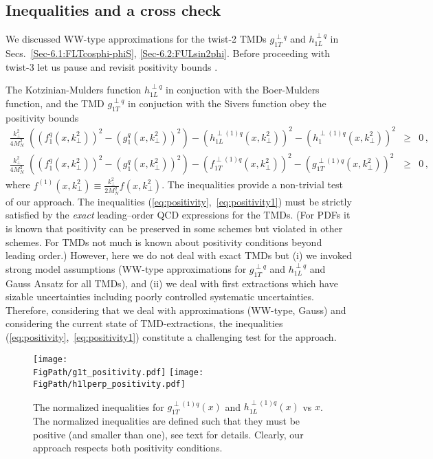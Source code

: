 \documentclass[a4paper,11pt]{article}
\newcommand{\blue}[1]{{\color{blue} #1}}
\newcommand{\ba}{\begin{eqnarray}}
\newcommand{\ea}{\end{eqnarray}}
\newcommand{\ps}[1]{\blue{ #1}}
\def\kperp{k_\perp}
\newcommand*{\FigPath}{./figs}%
\begin{document}
\ps{

\subsection{Inequalities and a cross check}

We discussed WW-type approximations for the twist-2 TMDs
$g^{\perp q}_{1T}$ and $h^{\perp q}_{1L}$ 
in Secs.~\ref{Sec-6.1:FLTcosphi-phiS}, \ref{Sec-6.2:FULsin2phi}.
Before proceeding with twist-3 let us pause and revisit positivity 
bounds \cite{Bacchetta:1999kz}. %

The Kotzinian-Mulders function $h^{\perp q}_{1L}$ in conjuction with 
the Boer-Mulders function, and the TMD $g^{\perp q}_{1T}$ in conjuction 
with the Sivers function obey the positivity bounds 
\cite{Bacchetta:1999kz}
\begin{subequations}\ba
	\frac{\kperp^2}{4M_N^2}\;\left((f_{1}^{q}(x,\kperp^2))^2 -(g_{1}^{q}(x,\kperp^2))^2\right)
	- (h^{\perp(1)q}_{1L}(x,\kperp^2))^2 
	- (h_{1}^{\perp(1)q}(x,\kperp^2))^2
	& \ge & 0\,, \label{eq:positivity}\\
	\frac{\kperp^2}{4M_N^2}\;\left((f_{1}^{q}(x,\kperp^2))^2 -(g_{1}^{q}(x,\kperp^2))^2\right)
	- (f_{1T}^{\perp(1)q}(x,\kperp^2))^2
	- (g^{\perp(1)q}_{1T}(x,\kperp^2))^2 
	& \ge & 0\,, \label{eq:positivity1}
\ea\end{subequations}
where $f^{(1)}(x,\kperp^2) \equiv \frac{\kperp^2}{2M_N^2} f(x,\kperp^2)$.
The inequalities provide a non-trivial test of our approach.
The inequalities (\ref{eq:positivity},~\ref{eq:positivity1}) 
must be strictly satisfied by the {\it exact} leading--order QCD 
expressions for the TMDs.  
(For PDFs it is known that positivity can be preserved in some 
schemes but violated in other schemes. For TMDs not much is 
known about positivity conditions beyond leading order.)
However, here we do not deal with exact TMDs but (i) we invoked 
strong model assumptions (WW-type approximations for $g^{\perp q}_{1T}$ 
and $h^{\perp q}_{1L}$ and Gauss Ansatz for all TMDs), and (ii) we deal 
with first extractions which have sizable uncertainties including 
poorly controlled systematic uncertainties.
Therefore, considering that we deal with approximations 
(WW-type, Gauss) and considering the current state of TMD-extractions, 
the inequalities (\ref{eq:positivity},~\ref{eq:positivity1}) constitute
a challenging test for the approach.

\begin{figure}[b!]
\centering
\texttt{[image: \\FigPath/g1t\_positivity.pdf]}  \quad
\texttt{[image: \\FigPath/h1lperp\_positivity.pdf]}  
	\caption{\label{h1l_pos} 
	The normalized inequalities for $g^{\perp(1)q}_{1T}(x)$ and
	$h^{\perp(1)q}_{1L}(x)$ vs $x$. The normalized inequalities
	are defined such that they must be positive (and smaller
	than one), see text for details. Clearly, our approach
	respects both positivity conditions.}
\end{figure}

}
\end{document}
